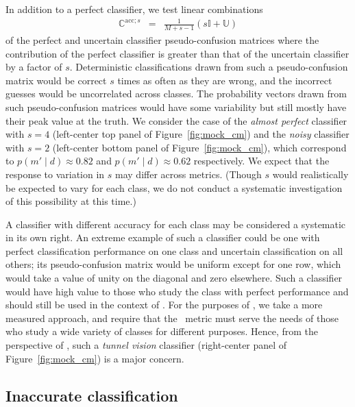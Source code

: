 In addition to a perfect classifier, we test linear combinations
\begin{eqnarray}
  \label{eq:lincomb}
  \mathbb{C}^{\mathrm{acc}; s} &=& \frac{1}{M+s-1} \left(s\mathbb{I} + \mathbb{U}\right)
\end{eqnarray}
of the perfect and uncertain classifier pseudo-confusion matrices where the contribution of the perfect classifier is greater than that of the uncertain classifier by a factor of $s$.
Deterministic classifications drawn from such a pseudo-confusion matrix would be correct $s$ times as often as they are wrong, and the incorrect guesses would be uncorrelated across classes.
The probability vectors drawn from such pseudo-confusion matrices would have some variability but still mostly have their peak value at the truth.
We consider the case of the \textit{almost perfect} classifier with $s=4$ (left-center top panel of Figure~\ref{fig:mock_cm}) and the \textit{noisy} classifier with $s=2$ (left-center bottom panel of Figure~\ref{fig:mock_cm}), which correspond to $p(m' \mid d)\approx0.82$ and $p(m' \mid d)\approx0.62$ respectively.
We expect that the response to variation in $s$ may differ across metrics.
(Though $s$ would realistically be expected to vary for each class, we do not conduct a systematic investigation of this possibility at this time.)

A classifier with different accuracy for each class may be considered a systematic in its own right.
An extreme example of such a classifier could be one with perfect classification performance on one class and uncertain classification on all others; its pseudo-confusion matrix would be uniform except for one row, which would take a value of unity on the diagonal and zero elsewhere.
Such a classifier would have high value to those who study the class with perfect performance and should still be used in the context of \lsst.
For the purposes of \plasticc, we take a more measured approach, and require that the \plasticc\ metric must serve the needs of those who study a wide variety of classes for different purposes. Hence, from the perspective of \plasticc, such a \textit{tunnel vision} classifier (right-center panel of Figure~\ref{fig:mock_cm}) is a major concern.
\subsection{Inaccurate classification}
\label{sec:inaccuratedata}


